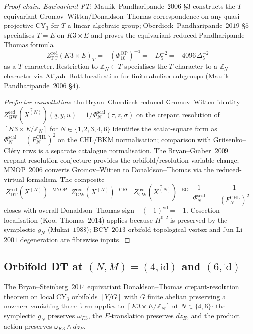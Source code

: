 \begin{proof}[Proof chain]
\emph{Equivariant PT}: Maulik--Pandharipande~$2006$ \S$3$ constructs the \(T\)-equivariant Gromov--Witten/Donaldson--Thomas correspondence on any quasi-projective CY\(_3\) for \(T\) a linear algebraic group; Oberdieck--Pandharipande~$2019$ \S$5$ specialises \(T = E\) on \(K3 \times E\) and proves the equivariant reduced Pandharipande--Thomas formula
\[
Z^{\mathrm{red}}_{\mathrm{PT}}(K3 \times E)_T
=-(\Phi_{10}^{\mathrm{OP}})^{-1}
=-D_5^{-2}
=-4096\,\Delta_5^{-2}
\]
as a \(T\)-character. Restriction to \(\mathbb{Z}_N \subset T\) specialises the \(T\)-character to a \(\mathbb{Z}_N\)-character via Atiyah--Bott localisation for finite abelian subgroups (Maulik--Pandharipande~$2006$ \S$4$).

\emph{Prefactor cancellation}: the Bryan--Oberdieck reduced Gromov--Witten identity $Z^{\mathrm{red}}_{\mathrm{GW}}(\widetilde{X^{(N)}})(q, y, u) = 1/\Phi_N^{\mathrm{scal}}(\tau, z, \sigma)$ on the crepant resolution of $[K3 \times E / \mathbb{Z}_N]$ for $N \in \{1, 2, 3, 4, 6\}$ identifies the scalar-square form as $\Phi_N^{\mathrm{scal}}=(F^{\mathrm{CHL}}_N)^2$ on the CHL/BKM normalisation; comparison with Gritsenko--Cl\'ery rows is a separate catalogue normalisation. The Bryan--Graber~$2009$ crepant-resolution conjecture provides the orbifold/resolution variable change; MNOP~$2006$ converts Gromov--Witten to Donaldson--Thomas via the reduced-virtual formalism. The composite
\[
Z^{\mathrm{red}}_{\mathrm{DT}}(X^{(N)}) \;\overset{\mathrm{MNOP}}{=}\; Z^{\mathrm{red}}_{\mathrm{GW}}(X^{(N)}) \;\overset{\mathrm{CRC}}{=}\; Z^{\mathrm{red}}_{\mathrm{GW}}(\widetilde{X^{(N)}}) \;\overset{\mathrm{BO}}{=}\; \frac{1}{\Phi_N^{\mathrm{scal}}} \;=\; \frac{1}{(F^{\mathrm{CHL}}_N)^2}
\]
closes with overall Donaldson--Thomas sign $-(-1)^{\mathrm{vd}} = -1$. Cosection localisation (Kool--Thomas~$2014$) applies because $H^{0, 2}$ is preserved by the symplectic $g_N$ (Mukai~$1988$); BCY~$2013$ orbifold topological vertex and Jun Li~$2001$ degeneration are fibrewise inputs.
\end{proof}

\subsection{Orbifold DT at \texorpdfstring{$(N, M) = (4, \mathrm{id})$}{(N, M) = (4, id)} and \texorpdfstring{$(6, \mathrm{id})$}{(6, id)}}
\label{subsec:k3e-lorgat-conj1-N46}

The Bryan--Steinberg~$2014$ equivariant Donaldson--Thomas crepant-resolution theorem on local CY$_3$ orbifolds $[Y/G]$ with $G$ finite abelian preserving a nowhere-vanishing three-form applies to $[K3 \times E/\mathbb{Z}_N]$ at $N \in \{4, 6\}$: the symplectic $g_N$ preserves $\omega_{K3}$, the $E$-translation preserves $dz_E$, and the product action preserves $\omega_{K3} \wedge dz_E$.

